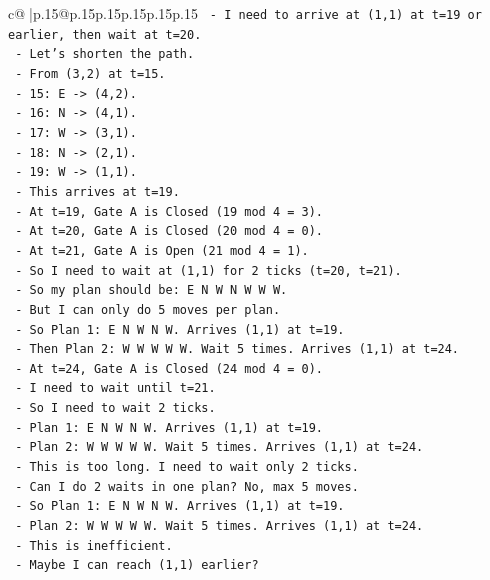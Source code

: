 \documentclass{article}
\begin{document}
{\begin{supertabular}{c@{$\;$}|p{.15\linewidth}@{}p{.15\linewidth}p{.15\linewidth}p{.15\linewidth}p{.15\linewidth}p{.15\linewidth}}
{{{\texttt{   {-} I need to arrive at (1,1) at t=19 or earlier, then wait at t=20.} \\
\texttt{   {-} Let's shorten the path.} \\
\texttt{   {-} From (3,2) at t=15.} \\
\texttt{   {-} 15: E {-}> (4,2).} \\
\texttt{   {-} 16: N {-}> (4,1).} \\
\texttt{   {-} 17: W {-}> (3,1).} \\
\texttt{   {-} 18: N {-}> (2,1).} \\
\texttt{   {-} 19: W {-}> (1,1).} \\
\texttt{   {-} This arrives at t=19.} \\
\texttt{   {-} At t=19, Gate A is Closed (19 mod 4 = 3).} \\
\texttt{   {-} At t=20, Gate A is Closed (20 mod 4 = 0).} \\
\texttt{   {-} At t=21, Gate A is Open (21 mod 4 = 1).} \\
\texttt{   {-} So I need to wait at (1,1) for 2 ticks (t=20, t=21).} \\
\texttt{   {-} So my plan should be: E N W N W W W.} \\
\texttt{   {-} But I can only do 5 moves per plan.} \\
\texttt{   {-} So Plan 1: E N W N W. Arrives (1,1) at t=19.} \\
\texttt{   {-} Then Plan 2: W W W W W. Wait 5 times. Arrives (1,1) at t=24.} \\
\texttt{   {-} At t=24, Gate A is Closed (24 mod 4 = 0).} \\
\texttt{   {-} I need to wait until t=21.} \\
\texttt{   {-} So I need to wait 2 ticks.} \\
\texttt{   {-} Plan 1: E N W N W. Arrives (1,1) at t=19.} \\
\texttt{   {-} Plan 2: W W W W W. Wait 5 times. Arrives (1,1) at t=24.} \\
\texttt{   {-} This is too long. I need to wait only 2 ticks.} \\
\texttt{   {-} Can I do 2 waits in one plan? No, max 5 moves.} \\
\texttt{   {-} So Plan 1: E N W N W. Arrives (1,1) at t=19.} \\
\texttt{   {-} Plan 2: W W W W W. Wait 5 times. Arrives (1,1) at t=24.} \\
\texttt{   {-} This is inefficient.} \\
\texttt{   {-} Maybe I can reach (1,1) earlier?} \\
}}}
\end{supertabular}}
\end{document}
